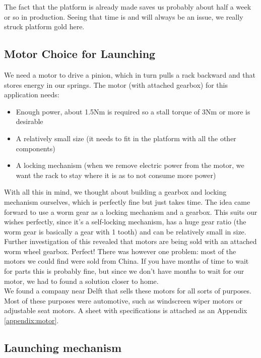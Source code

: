 \documentclass[11pt,twoside,a4paper]{report}
\begin{document}
The fact that the platform is already made saves us probably about half a week or so in production. Seeing that time is and will always be an issue, we really struck platform gold here.\\

\subsection{Motor Choice for Launching}
We need a motor to drive a pinion, which in turn pulls a rack backward and that stores energy in our springs. The motor (with attached gearbox) for this application needs:
\begin{itemize}
\item Enough power, about 1.5Nm is required so a stall torque of 3Nm or more is desirable
\item A relatively small size (it needs to fit in the platform with all the other components)
\item A locking mechanism (when we remove electric power from the motor, we want the rack to stay where it is as to not consume more power)
\end{itemize}

With all this in mind, we thought about building a gearbox and locking mechanism ourselves, which is perfectly fine but just takes time. The idea came forward to use a worm gear as a locking mechanism and a gearbox. This suits our wishes perfectly, since it\rq{}s a self-locking mechanism, has a huge gear ratio (the worm gear is basically a gear with 1 tooth) and can be relatively small in size.\\
Further investigation of this revealed that motors are being sold with an attached worm wheel gearbox. Perfect! There was however one problem: most of the motors we could find were sold from China. If you have months of time to wait for parts this is probably fine, but since we don\rq{}t have months to wait for our motor, we had to found a solution closer to home.\\
We found a company near Delft that sells these motors for all sorts of purposes. Most of these purposes were automotive, such as windscreen wiper motors or adjustable seat motors. A sheet with specifications is attached as an Appendix \ref{appendix:motor}.

\subsection{Launching mechanism}
\end{document}
